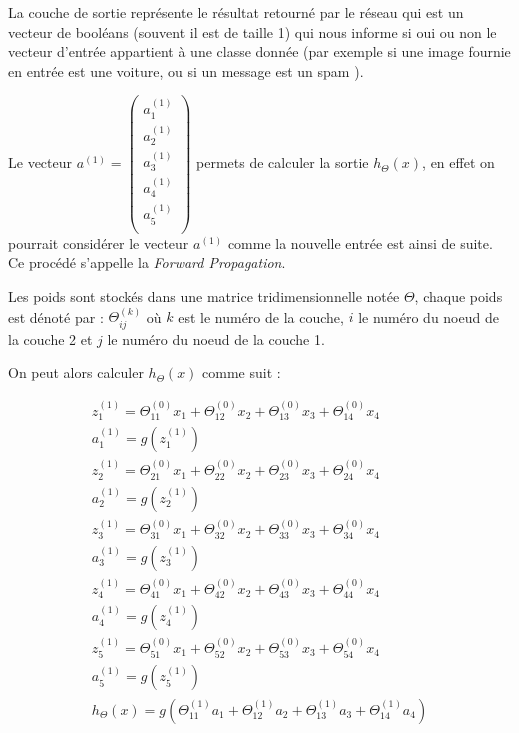 La couche de sortie représente le résultat retourné par le réseau qui est un vecteur de booléans (souvent il est de taille 1) qui nous informe si oui ou non le vecteur d'entrée appartient à une classe donnée (par exemple si une image fournie en entrée est une voiture, ou si un message est un spam ).

Le vecteur $a^{(1)} = \begin{pmatrix}
  a_1^{(1)}  \\
  a_2^{(1)}  \\
  a_3^{(1)}  \\
  a_4^{(1)}  \\
  a_5^{(1)}  \\
 \end{pmatrix}$
permets de calculer la sortie $h_\Theta(x)$, en effet on pourrait considérer le vecteur $a^{(1)}$ comme la nouvelle entrée est ainsi de suite. Ce procédé s'appelle la \textit{Forward Propagation}.

Les poids sont stockés dans une matrice tridimensionnelle notée $\Theta$, chaque poids est dénoté par : $\Theta_{ij}^{(k)}$ où $k$ est le numéro de la couche, $i$ le numéro du noeud de la couche 2 et $j$ le numéro du noeud de la couche 1.

On peut alors calculer $h_\Theta(x)$ comme suit :

\begin{gather*}
    z_1^{(1)} = \Theta_{11}^{(0)}x_1 + \Theta_{12}^{(0)}x_2 + \Theta_{13}^{(0)}x_3 + \Theta_{14}^{(0)}x_4\\
    a_1^{(1)} = g(z_1^{(1)})\\
    z_2^{(1)} = \Theta_{21}^{(0)}x_1 + \Theta_{22}^{(0)}x_2 + \Theta_{23}^{(0)}x_3 + \Theta_{24}^{(0)}x_4\\
    a_2^{(1)} = g(z_2^{(1)})\\
    z_3^{(1)} = \Theta_{31}^{(0)}x_1 + \Theta_{32}^{(0)}x_2 + \Theta_{33}^{(0)}x_3 + \Theta_{34}^{(0)}x_4\\
    a_3^{(1)} = g(z_3^{(1)})\\
    z_4^{(1)} = \Theta_{41}^{(0)}x_1 + \Theta_{42}^{(0)}x_2 + \Theta_{43}^{(0)}x_3 + \Theta_{44}^{(0)}x_4\\
    a_4^{(1)} = g(z_4^{(1)})\\
    z_5^{(1)} = \Theta_{51}^{(0)}x_1 + \Theta_{52}^{(0)}x_2 + \Theta_{53}^{(0)}x_3 + \Theta_{54}^{(0)}x_4\\
    a_5^{(1)} = g(z_5^{(1)})\\
    h_\Theta(x) = g(\Theta_{11}^{(1)}a_1 + \Theta_{12}^{(1)}a_2 + \Theta_{13}^{(1)}a_3 + \Theta_{14}^{(1)}a_4)\\
\end{gather*}

